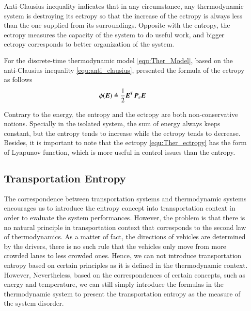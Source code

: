 \documentclass[preprint,authoryear,12pt]{elsarticle}
\renewcommand{\vec}[1]{\mbox{\boldmath$#1$}}
\newcommand{\mat}[1]{\mbox{\boldmath$#1$}}
\begin{document}
Anti-Clausius inequality indicates that in any circumstance, any thermodynamic system is destroying its ectropy so that the increase of the ectropy is always less than the one supplied from its surroundings. Opposite with the entropy, the ectropy measures the capacity of the system to do useful work, and bigger ectropy corresponds to better organization of the system.

For the discrete-time thermodynamic model \eqref{equ:Ther_Model}, based on the anti-Clausius inequality \eqref{equ:anti_clausius}, \citet{haddad_thermodynamic_2005} presented the formula of the ectropy as follows
\begin{align}
\phi(\vec{E})&\triangleq\frac{1}{2}\vec{E}^T \mat{P}_e \vec{E}
\label{equ:Ther_ectropy}
\end{align}

Contrary to the energy, the entropy and the ectropy are both non-conservative notions. Specially in the isolated system, the sum of energy always keeps constant, but the entropy tends to increase while the ectropy tends to decrease. Besides, it is important to note that the ectropy \eqref{equ:Ther_ectropy} has the form of Lyapunov function, which is more useful in control issues than the entropy.

\subsection{Transportation Entropy}
The correspondence between transportation systems and thermodynamic systems encourages us to introduce the entropy concept into transportation context in order to evaluate the system performances. However, the problem is that there is no natural principle in transportation context that corresponds to the second law of thermodynamics. As a matter of fact, the directions of vehicles are determined by the drivers, there is no such rule that the vehicles only move from more crowded lanes to less crowded ones. Hence, we can not introduce transportation entropy based on certain principles as it is defined in the thermodynamic context. However, Nevertheless, based on the correspondences of certain concepts, such as energy and temperature, we can still simply introduce the formulas in the thermodynamic system to present the transportation entropy as the measure of the system disorder.
\end{document}
